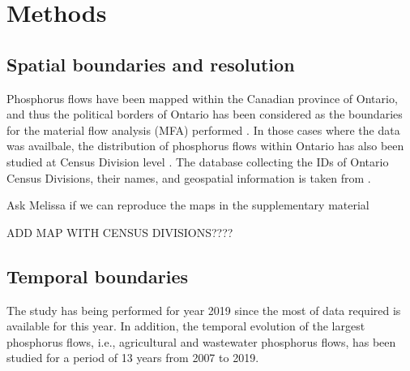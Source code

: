 \documentclass[authoryear]{elsarticle}
\begin{document}
\section{Methods}

%

\subsection{Spatial boundaries and resolution}
Phosphorus flows have been mapped within the Canadian province of Ontario, and thus the political borders of Ontario has been considered as the boundaries for the material flow analysis (MFA) performed \citep{brunner2016handbook}. In those cases where the data was availbale, the distribution of phosphorus flows within Ontario has also been studied at Census Division level \citep{CensusDivisionCD}. The database collecting the IDs of Ontario Census Divisions, their names, and geospatial information is taken from \citet{CensusDivisionOpendatasoft}.

{\color{red}Ask Melissa if we can reproduce the maps in the supplementary material}

{\color{red}ADD MAP WITH CENSUS DIVISIONS????}

\subsection{Temporal boundaries}
The study has being performed for year 2019 since the most of data required is available for this year. In addition, the temporal evolution of the largest phosphorus flows, i.e., agricultural and wastewater phosphorus flows, has been studied for a period of 13 years from 2007 to 2019.
\end{document}
